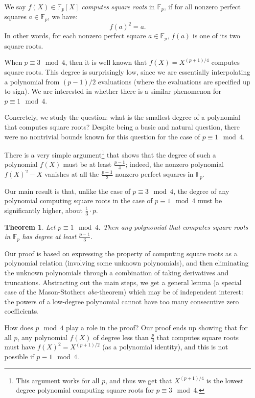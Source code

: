\documentclass{article}
\newtheorem{theorem}{Theorem}[section]
\newcommand{\F}{\mathbb{F}}
\begin{document}
We say $f(X) \in \F_p[X]$ {\em computes square roots} in $\F_p$, if
for all nonzero perfect squares $a \in \F_p$, we have:
$$f(a)^2 = a.$$ In other words, for each nonzero perfect square $a \in \F_p$, $f(a)$ is one of its two square roots.


When $p \equiv 3 \mod 4$, then it is well known that $f(X) = X^{(p+1)/4}$ computes square roots. This degree is surprisingly low, since we are essentially interpolating a polynomial from $(p-1)/2$ evaluations (where the evaluations are specified up to sign). We are interested in whether there is a similar phenomenon for $p \equiv 1 \mod 4$.

Concretely, we study the question: what is the smallest degree of a polynomial that computes square roots? Despite being a basic and natural question, there were no nontrivial bounds known for this question for the case of $p \equiv 1 \mod 4$. 

There is a very simple argument\footnote{This argument works for all $p$, and thus we get that $X^{(p+1)/4}$ is the lowest degree polynomial computing square roots for $p \equiv 3 \mod 4$.}  that shows that the degree of such a polynomial $f(X)$ must be at least $\frac{p-1}{4}$; indeed, the nonzero polynomial $f(X)^2 - X$ vanishes at all the $\frac{p-1}{2}$ nonzero perfect squares in $\F_p$. 

Our main result is that, unlike the case of $p \equiv 3 \mod 4$, the degree of any polynomial computing square roots in the case of $p \equiv 1 \mod 4$ must be significantly higher, about $\frac{1}{3}\cdot p$.
\begin{theorem}
\label{thm:1mod4}
 Let $p \equiv 1 \mod 4$. Then any polynomial that computes square roots in $\F_p$ has degree at least $\frac{p-1}{3}$.
\end{theorem}
Our proof is based on expressing the property of computing square roots as a polynomial relation (involving some unknown polynomials), and then eliminating the unknown polynomials through a combination of taking derivatives and truncations. Abstracting out the main steps, we get a general lemma (a special case of the Mason-Stothers {\em abc}-theorem) which may be of independent interest: the powers of a low-degree polynomial cannot have too many consecutive zero coefficients.



How does  $p \mod 4$ play a role in the proof? Our proof ends up showing that for all $p$, any polynomial $f(X)$ of degree less than $\frac{p}{3}$ that computes square roots must have $f(X)^2 = X^{(p+1)/2}$ (as a polynomial identity), and this is not possible if $p \equiv 1 \mod 4$.
\end{document}

